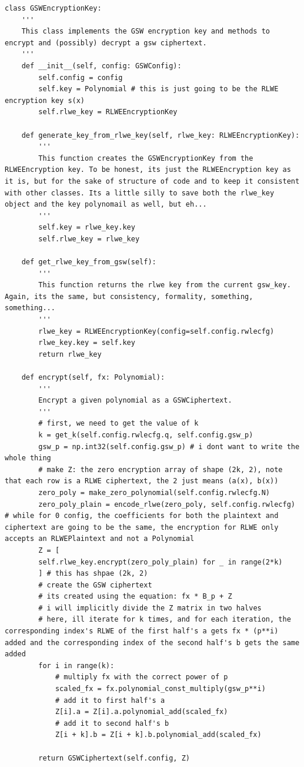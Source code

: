 \documentclass{report}
\begin{document}
\begin{verbatim}
class GSWEncryptionKey:
	'''
	This class implements the GSW encryption key and methods to encrypt and (possibly) decrypt a gsw ciphertext.
	'''
	def __init__(self, config: GSWConfig):
		self.config = config
		self.key = Polynomial # this is just going to be the RLWE encryption key s(x)
		self.rlwe_key = RLWEEncryptionKey
	
	def generate_key_from_rlwe_key(self, rlwe_key: RLWEEncryptionKey):
		'''
		This function creates the GSWEncryptionKey from the RLWEEncryption key. To be honest, its just the RLWEEncryption key as it is, but for the sake of structure of code and to keep it consistent with other classes. Its a little silly to save both the rlwe_key object and the key polynomail as well, but eh...
		'''
		self.key = rlwe_key.key
		self.rlwe_key = rlwe_key
	
	def get_rlwe_key_from_gsw(self):
		'''
		This function returns the rlwe key from the current gsw_key. Again, its the same, but consistency, formality, something, something...
		'''
		rlwe_key = RLWEEncryptionKey(config=self.config.rwlecfg)
		rlwe_key.key = self.key
		return rlwe_key
		
	def encrypt(self, fx: Polynomial):
		'''
		Encrypt a given polynomial as a GSWCiphertext.
		'''
		# first, we need to get the value of k
		k = get_k(self.config.rwlecfg.q, self.config.gsw_p)
		gsw_p = np.int32(self.config.gsw_p) # i dont want to write the whole thing
		# make Z: the zero encryption array of shape (2k, 2), note that each row is a RLWE ciphertext, the 2 just means (a(x), b(x))
		zero_poly = make_zero_polynomial(self.config.rwlecfg.N)
		zero_poly_plain = encode_rlwe(zero_poly, self.config.rwlecfg) # while for 0 config, the coefficients for both the plaintext and ciphertext are going to be the same, the encryption for RLWE only accepts an RLWEPlaintext and not a Polynomial
		Z = [
		self.rlwe_key.encrypt(zero_poly_plain) for _ in range(2*k)
		] # this has shpae (2k, 2)
		# create the GSW ciphertext
		# its created using the equation: fx * B_p + Z
		# i will implicitly divide the Z matrix in two halves 
		# here, ill iterate for k times, and for each iteration, the corresponding index's RLWE of the first half's a gets fx * (p**i) added and the corresponding index of the second half's b gets the same added
		for i in range(k):
			# multiply fx with the correct power of p
			scaled_fx = fx.polynomial_const_multiply(gsw_p**i)
			# add it to first half's a
			Z[i].a = Z[i].a.polynomial_add(scaled_fx)
			# add it to second half's b
			Z[i + k].b = Z[i + k].b.polynomial_add(scaled_fx)
		
		return GSWCiphertext(self.config, Z)
\end{verbatim}
\end{document}
